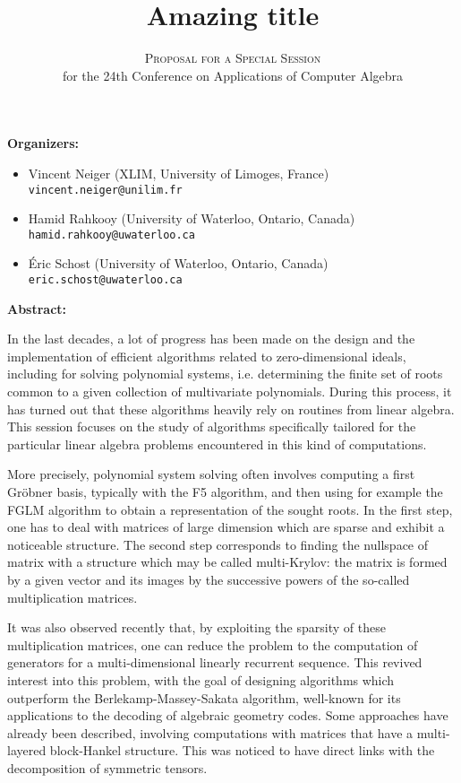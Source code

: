 \documentclass[12pt,english]{article}
\title{Amazing title}
\author{\textsc{Proposal for a Special Session} \\
  for the 24th Conference on Applications of Computer Algebra}
\date{}
\begin{document}
\maketitle

\textbf{Organizers:}
\begin{itemize}
  \item Vincent Neiger (XLIM, University of Limoges, France) \\
    {\small \verb+vincent.neiger@unilim.fr+}
  \item Hamid Rahkooy (University of Waterloo, Ontario, Canada) \\
    {\small \verb+hamid.rahkooy@uwaterloo.ca+}
  \item \'Eric Schost (University of Waterloo, Ontario, Canada) \\
    {\small \texttt{eric.schost@uwaterloo.ca}}
\end{itemize}

\textbf{Abstract:}

In the last decades, a lot of progress has been made on the design and the
implementation of efficient algorithms related to zero-dimensional ideals,
including for solving polynomial systems, i.e. determining the finite set of
roots common to a given collection of multivariate polynomials.  During this
process, it has turned out that these algorithms heavily rely on routines from
linear algebra.  This session focuses on the study of algorithms specifically
tailored for the particular linear algebra problems encountered in this kind of
computations.

More precisely, polynomial system solving often involves computing a first
Gr\"obner basis, typically with the F5 algorithm,
and then using for example
the FGLM algorithm
to obtain a representation of the sought roots.  In the
first step, one has to deal with matrices of large dimension which are sparse
and exhibit a noticeable structure.  The second step corresponds to finding the
nullspace of matrix with a structure which may be called multi-Krylov: the matrix
is formed by a given vector and its images by the successive powers of the
so-called multiplication matrices.

It was also observed recently
that, by exploiting the sparsity of these multiplication matrices, one can
reduce the problem to the computation of generators for a multi-dimensional
linearly recurrent sequence. 
This revived interest into this problem, with the goal of designing algorithms
which outperform the Berlekamp-Massey-Sakata algorithm, well-known for its
applications to the decoding of algebraic geometry codes.  Some approaches have
already been described,
involving computations with matrices that have a multi-layered block-Hankel
structure.  This was noticed to have direct links with the decomposition of
symmetric tensors.
\end{document}
